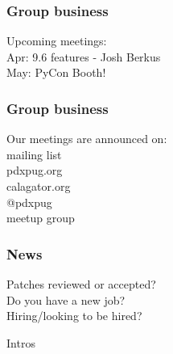 \documentclass{beamer}
\begin{document}
\frame
{
  \frametitle{Group business}
  \begin{center}
{\large Upcoming meetings:\\}
Apr: 9.6 features - Josh Berkus\\
May: PyCon Booth!\\
\vspace{5mm}
  \end{center}
}

\frame
{
  \frametitle{Group business}
  \begin{center}
{\large Our meetings are announced on:\\}
mailing list\\
pdxpug.org\\
calagator.org\\
@pdxpug\\
meetup group\\
\vspace{5mm}
  \end{center}
}

\frame
{
  \frametitle{News}
  \begin{center}
Patches reviewed or accepted?\\
Do you have a new job?\\
Hiring/looking to be hired?\\
  \end{center}
}

\frame
{
  \begin{center}
{\huge Intros\\}
  \end{center}
}
\end{document}
